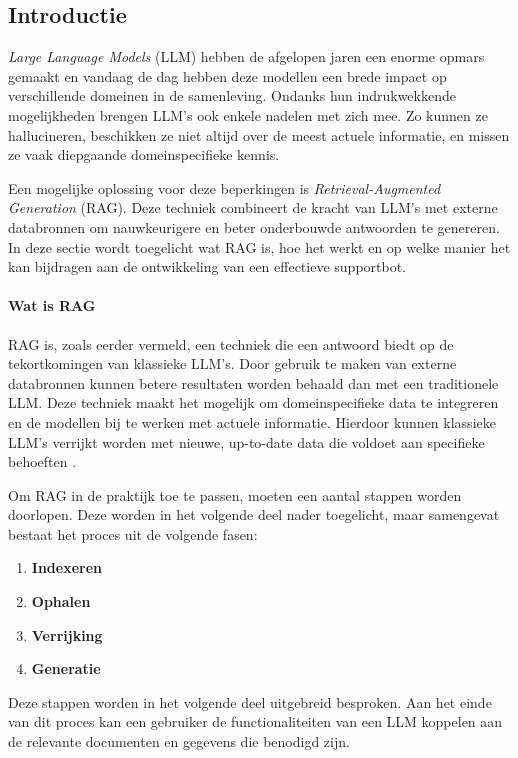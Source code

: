     \subsection{Introductie}   
    \textit{Large Language Models} (LLM) hebben de afgelopen jaren een enorme opmars gemaakt en vandaag de dag hebben deze modellen een brede impact op verschillende domeinen in de samenleving. Ondanks hun indrukwekkende mogelijkheden brengen LLM’s ook enkele nadelen met zich mee. Zo kunnen ze hallucineren, beschikken ze niet altijd over de meest actuele informatie, en missen ze vaak diepgaande domeinspecifieke kennis.  
    
    Een mogelijke oplossing voor deze beperkingen is \textit{Retrieval-Augmented Generation} (RAG). Deze techniek combineert de kracht van LLM’s met externe databronnen om nauwkeurigere en beter onderbouwde antwoorden te genereren. In deze sectie wordt toegelicht wat RAG is, hoe het werkt en op welke manier het kan bijdragen aan de ontwikkeling van een effectieve supportbot.
    
    \paragraph{Wat is RAG}
    RAG is, zoals eerder vermeld, een techniek die een antwoord biedt op de tekortkomingen van klassieke LLM’s. Door gebruik te maken van externe databronnen kunnen betere resultaten worden behaald dan met een traditionele LLM. Deze techniek maakt het mogelijk om domeinspecifieke data te integreren en de modellen bij te werken met actuele informatie. Hierdoor kunnen klassieke LLM’s verrijkt worden met nieuwe, up-to-date data die voldoet aan specifieke behoeften \autocite{Wu2024}.
    
    Om RAG in de praktijk toe te passen, moeten een aantal stappen worden doorlopen. Deze worden in het volgende deel nader toegelicht, maar samengevat bestaat het proces uit de volgende fasen:
    
    \begin{enumerate}
        \item \textbf{Indexeren}
        \item \textbf{Ophalen}
        \item \textbf{Verrijking}
        \item \textbf{Generatie}
    \end{enumerate}
    
    Deze stappen worden in het volgende deel uitgebreid besproken. Aan het einde van dit proces kan een gebruiker de functionaliteiten van een LLM koppelen aan de relevante documenten en gegevens die benodigd zijn.
    
